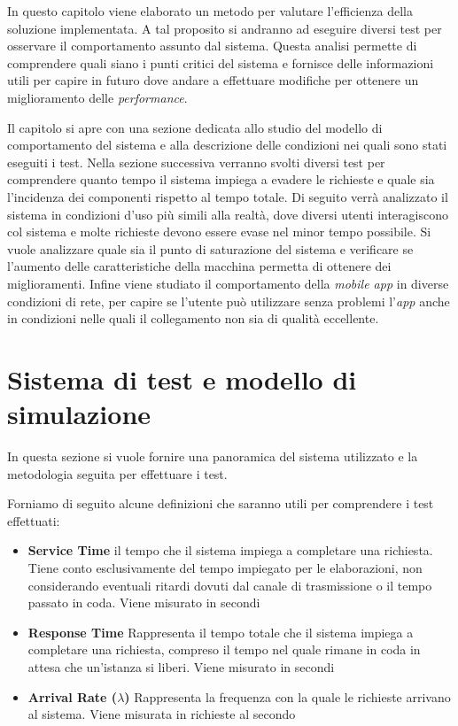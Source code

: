 In questo capitolo viene elaborato un metodo per valutare l'efficienza della soluzione implementata. A tal proposito si andranno ad eseguire diversi test per osservare il comportamento assunto dal sistema. Questa analisi permette di comprendere quali siano i punti critici del sistema e fornisce delle informazioni utili per capire in futuro dove andare a effettuare modifiche per ottenere un miglioramento delle \emph{performance}.

Il capitolo si apre con una sezione dedicata allo studio del modello di comportamento del sistema e alla descrizione delle condizioni nei quali sono stati eseguiti i test. Nella sezione successiva verranno svolti diversi test per comprendere quanto tempo il sistema impiega a evadere le richieste e quale sia l'incidenza dei componenti rispetto al tempo totale. Di seguito verrà analizzato il sistema in condizioni d'uso più simili alla realtà, dove diversi utenti interagiscono col sistema e molte richieste devono essere evase nel minor tempo possibile. Si vuole analizzare quale sia il punto di saturazione del sistema e verificare se l'aumento delle caratteristiche della macchina permetta di ottenere dei miglioramenti. Infine viene studiato il comportamento della \emph{mobile app} in diverse condizioni di rete, per capire se l'utente può utilizzare senza problemi l'\emph{app} anche in condizioni nelle quali il collegamento non sia di qualità eccellente.

\section{Sistema di test e modello di simulazione\label{sec:sistema-e-modello}}

In questa sezione si vuole fornire una panoramica del sistema utilizzato e la metodologia seguita per effettuare i test.

Forniamo di seguito alcune definizioni che saranno utili per comprendere i test effettuati:

\begin{itemize}
	\item \textbf{Service Time}
	\upe il tempo che il sistema impiega a completare una richiesta. Tiene conto esclusivamente del tempo impiegato per le elaborazioni, non considerando eventuali ritardi dovuti dal canale di trasmissione o il tempo passato in coda. Viene misurato in secondi
	\item \textbf{Response Time}
	Rappresenta il tempo totale che il sistema impiega a completare una richiesta, compreso il tempo nel quale rimane in coda in attesa che un'istanza si liberi. Viene misurato in secondi
	\item \textbf{Arrival Rate ($ \lambda $)}
	Rappresenta la frequenza con la quale le richieste arrivano al sistema. Viene misurata in richieste al secondo
\end{itemize}

